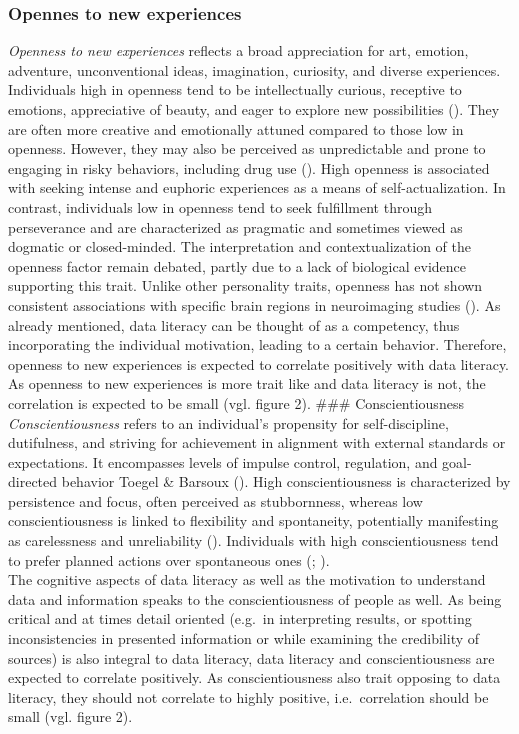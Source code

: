 \documentclass[
  12pt,
  a4paper,
  twoside]{article}
\begin{document}
\subsubsection{Opennes to new experiences}\label{opennes-to-new-experiences}

\emph{Openness to new experiences} reflects a broad appreciation for art, emotion, adventure, unconventional ideas, imagination, curiosity, and diverse experiences. Individuals high in openness tend to be intellectually curious, receptive to emotions, appreciative of beauty, and eager to explore new possibilities (). They are often more creative and emotionally attuned compared to those low in openness. However, they may also be perceived as unpredictable and prone to engaging in risky behaviors, including drug use (). High openness is associated with seeking intense and euphoric experiences as a means of self-actualization. In contrast, individuals low in openness tend to seek fulfillment through perseverance and are characterized as pragmatic and sometimes viewed as dogmatic or closed-minded. The interpretation and contextualization of the openness factor remain debated, partly due to a lack of biological evidence supporting this trait. Unlike other personality traits, openness has not shown consistent associations with specific brain regions in neuroimaging studies (). As already mentioned, data literacy can be thought of as a competency, thus incorporating the individual motivation, leading to a certain behavior. Therefore, openness to new experiences is expected to correlate positively with data literacy. As openness to new experiences is more trait like and data literacy is not, the correlation is expected to be small (vgl. figure 2).
\#\#\# Conscientiousness
\emph{Conscientiousness} refers to an individual's propensity for self-discipline, dutifulness, and striving for achievement in alignment with external standards or expectations. It encompasses levels of impulse control, regulation, and goal-directed behavior Toegel \& Barsoux (). High conscientiousness is characterized by persistence and focus, often perceived as stubbornness, whereas low conscientiousness is linked to flexibility and spontaneity, potentially manifesting as carelessness and unreliability (). Individuals with high conscientiousness tend to prefer planned actions over spontaneous ones (; ).\\
The cognitive aspects of data literacy as well as the motivation to understand data and information speaks to the conscientiousness of people as well. As being critical and at times detail oriented (e.g.~in interpreting results, or spotting inconsistencies in presented information or while examining the credibility of sources) is also integral to data literacy, data literacy and conscientiousness are expected to correlate positively. As conscientiousness also trait opposing to data literacy, they should not correlate to highly positive, i.e.~correlation should be small (vgl. figure 2).
\end{document}
